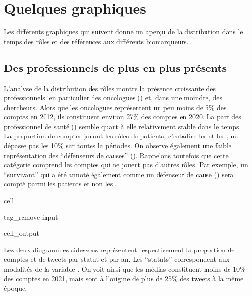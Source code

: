 \documentclass[letterpaper,10pt,english]{jupyterBook}
\begin{document}
\section{Quelques graphiques}
\label{\detokenize{analyse_preleminaire:quelques-graphiques}}\label{\detokenize{analyse_preleminaire::doc}}
\sphinxAtStartPar
Les différents graphiques qui suivent donne un aperçu de la distribution dans le temps des rôles et des références aux différents biomarqueurs.


\subsection{Des professionnels de plus en plus présents}
\label{\detokenize{analyse_preleminaire:des-professionnels-de-plus-en-plus-presents}}
\sphinxAtStartPar
L’analyse de la distribution des rôles montre la présence croissante des professionnels, en particulier des oncologues () et, dans une moindre, des chercheurs. Alors que les oncologues représentent un peu moins de 5\% des comptes en 2012, ils constituent environ 27\% des comptes en 2020. La part des professionnel de santé () semble quant à elle relativement stable dans le temps. La proportion de comptes jouant les rôles de patients, c’est\sphinxhyphen{}à\sphinxhyphen{}dire les  et les , ne dépasse pas les 10\% sur toutes la périodes. On observe également une faible représentation des “défenseurs de causes” (). Rappelons toutefois que cette catégorie comprend les comptes qui ne jouent pas d’autres rôles. Par exemple, un “survivant” qui a été annoté également comme un défenseur de cause () sera compté parmi les patients et non les .

\begin{sphinxuseclass}{cell}
\begin{sphinxuseclass}{tag_remove-input}\begin{sphinxVerbatimOutput}

\begin{sphinxuseclass}{cell_output}
\end{sphinxuseclass}\end{sphinxVerbatimOutput}

\end{sphinxuseclass}
\end{sphinxuseclass}
\sphinxAtStartPar
Les deux diagrammes ci\sphinxhyphen{}dessous représentent respectivement la proportion de comptes et de tweets par statut et par an. Les “statuts” correspondent aux modalités de la variable . On voit ainsi que les médias constituent moins de 10\% des comptes en 2021, mais sont à l’origine de plus de 25\% des tweets à la même époque.
\end{document}

